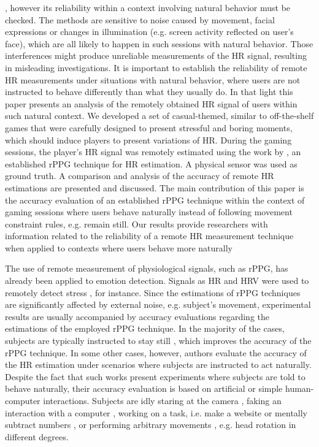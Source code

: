 , however its reliability within a context involving natural behavior must be checked. The methods are sensitive to noise caused by movement, facial expressions or changes in illumination (e.g. screen activity reflected on user's face), which are all likely to happen in such sessions with natural behavior. Those interferences might produce unreliable measurements of the HR signal, resulting in misleading investigations. It is important to establish the reliability of remote HR measurements under situations with natural behavior, where users are not instructed to behave differently than what they usually do. In that light this paper presents an analysis of the remotely obtained HR signal of users within such natural context. We developed a set of casual-themed, similar to off-the-shelf games that were carefully designed to present stressful and boring moments, which should induce players to present variations of HR. During the gaming sessions, the player's HR signal was remotely estimated using the work by \textcite{poh2011advancements}, an established rPPG technique for HR estimation. A physical sensor was used as ground truth. A comparison and analysis of the accuracy of remote HR estimations are presented and discussed. The main contribution of this paper is the accuracy evaluation of an established rPPG technique within the context of gaming sessions where users behave naturally instead of following movement constraint rules, e.g. remain still. Our results provide researchers with information related to the reliability of a remote HR measurement technique when applied to contexts where users behave more naturally

The use of remote measurement of physiological signals, such as rPPG, has already been applied to emotion detection. Signals as HR and HRV were used to remotely detect stress \parencite{mcduffcogcam, mcduff2014improvements, bousefsaf2013remote}, for instance. Since the estimations of rPPG techniques are significantly affected by external noise, e.g. subject's movement, experimental results are usually accompanied by accuracy evaluations regarding the estimations of the employed rPPG technique. In the majority of the cases, subjects are typically instructed to stay still \parencite{rouast2016remote}, which improves the accuracy of the rPPG technique. In some other cases, however, authors evaluate the accuracy of the HR estimation under scenarios where subjects are instructed to act naturally. Despite the fact that such works present experiments where subjects are told to behave naturally, their accuracy evaluation is based on artificial or simple human-computer interactions. Subjects are idly staring at the camera \parencite{zhao2013remote,hsu2014learning}, faking an interaction with a computer \parencite{poh2010non}, working on a task, i.e. make a website \parencite{monkaresi2014machine} or mentally subtract numbers \parencite{mcduff2014remote}, or performing arbitrary movements \parencite{tran2015robust}, e.g. head rotation in different degrees.

